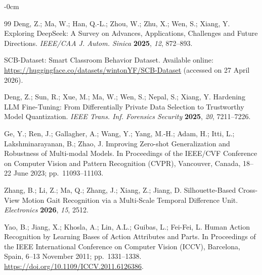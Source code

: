 \documentclass[symmetry,article,submit,pdftex,moreauthors]{Definitions/mdpi}
\begin{document}
\begin{adjustwidth}{-\extralength}{0cm}
\begin{thebibliography}{99}
Deng, Z.; Ma, W.; Han, Q.-L.; Zhou, W.; Zhu, X.; Wen, S.; Xiang, Y.
Exploring DeepSeek: A Survey on Advances, Applications, Challenges and Future Directions.
\textit{IEEE/CAA J. Autom. Sinica} \textbf{2025}, \textit{12}, 872--893.

SCB-Dataset: Smart Classroom Behavior Dataset.
Available online: \url{https://huggingface.co/datasets/wintonYF/SCB-Dataset} (accessed on 27 April 2026).

Deng, Z.; Sun, R.; Xue, M.; Ma, W.; Wen, S.; Nepal, S.; Xiang, Y.
Hardening LLM Fine-Tuning: From Differentially Private Data Selection to Trustworthy Model Quantization.
\textit{IEEE Trans. Inf. Forensics Security} \textbf{2025}, \textit{20}, 7211--7226.

Ge, Y.; Ren, J.; Gallagher, A.; Wang, Y.; Yang, M.-H.; Adam, H.; Itti, L.; Lakshminarayanan, B.; Zhao, J.
Improving Zero-shot Generalization and Robustness of Multi-modal Models.
In Proceedings of the IEEE/CVF Conference on Computer Vision and Pattern Recognition (CVPR), Vancouver, Canada, 18--22 June 2023; pp.~11093--11103.

Zhang, B.; Li, Z.; Ma, Q.; Zhang, J.; Xiang, Z.; Jiang, D.
Silhouette-Based Cross-View Motion Gait Recognition via a Multi-Scale Temporal Difference Unit.
\textit{Electronics} \textbf{2026}, \textit{15}, 2512.

Yao, B.; Jiang, X.; Khosla, A.; Lin, A.L.; Guibas, L.; Fei-Fei, L.
Human Action Recognition by Learning Bases of Action Attributes and Parts.
In Proceedings of the IEEE International Conference on Computer Vision (ICCV), Barcelona, Spain, 6--13 November 2011; pp.~1331--1338. \url{https://doi.org/10.1109/ICCV.2011.6126386}.

\end{thebibliography}

\end{adjustwidth}
\end{document}
